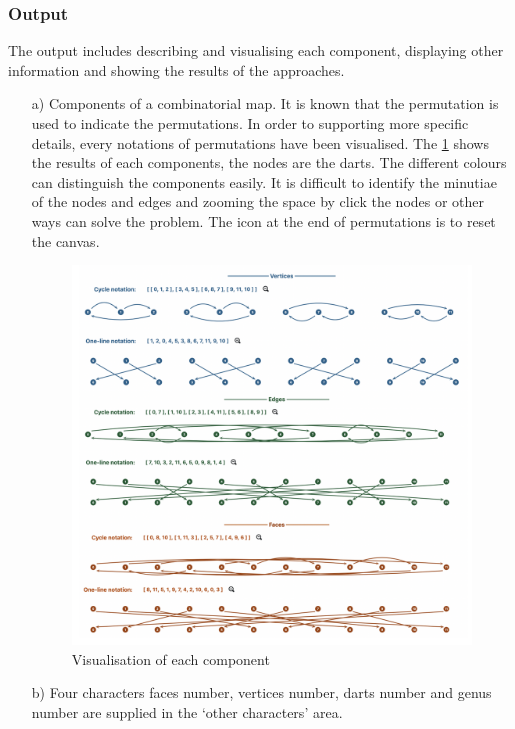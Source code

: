   \subsubsection{Output}
  The output includes describing and visualising each component, displaying other information and showing the results of the approaches.
  \begin{itemize}
    \item[a)] Components of a combinatorial map. It is known that the permutation is used to indicate the permutations. In order to supporting more specific details, every notations of permutations have been visualised. The \cref{fig:figures:components} shows the results of each components, the nodes are the darts. The different colours can distinguish the components easily. It is difficult to identify the minutiae of the nodes and edges and zooming the space by click the nodes or other ways can solve the problem. The icon at the end of permutations is to reset the canvas.
    \begin{figure}[htb]
        \centering
        \includegraphics[width=1\textwidth]{../../image/components.png}
        \caption{Visualisation of each component}
        \label{fig:figures:components}
      \end{figure}
    \newpage
    \item[b)] Four characters faces number, vertices number, darts number and genus number are supplied in the `other characters’ area.

\end{itemize}
